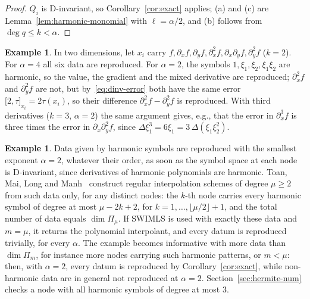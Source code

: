 \documentclass[12pt]{amsart}
\theoremstyle{definition}
\newtheorem{example}[theorem]{Example}
\theoremstyle{remark}
\newcommand{\fpz}[3]{\bigl[#1,#2\bigr]_{#3}}     %
\begin{document}
\begin{proof}
$Q_i$ is D-invariant, so Corollary~\ref{cor:exact} applies; (a) and (c) are
Lemma~\ref{lem:harmonic-monomial} with $\ell=\alpha/2$, and (b) follows from
$\deg q\le k<\alpha$.
\end{proof}

\begin{example}\label{ex:hermite2d}
In two dimensions, let $x_i$ carry $f,\partial_xf,\partial_yf,\partial_x^2f,\partial_x\partial_yf,
\partial_y^2f$ ($k=2$). For $\alpha=4$ all six data are reproduced. For $\alpha=2$, the symbols
$1,\xi_1,\xi_2,\xi_1\xi_2$ are harmonic, so the value, the gradient and the mixed derivative
are reproduced; $\partial_x^2f$ and $\partial_y^2f$ are not, but by~\eqref{eq:dinv-error} both
have the same error $\fpz{2}{\tau}{x_i}=2\tau(x_i)$, so their difference
$\partial_x^2f-\partial_y^2f$ is reproduced. With third derivatives ($k=3$, $\alpha=2$) the
same argument gives, e.g., that the error in $\partial_x^3f$ is three times the error in
$\partial_x\partial_y^2f$, since $\Delta\xi_1^3=6\xi_1=3\,\Delta(\xi_1\xi_2^2)$.
\end{example}

\begin{example}\label{ex:harmonic}
Data given by harmonic symbols are reproduced with the smallest exponent $\alpha=2$, whatever
their order, as soon as the symbol space at each node is D-invariant, since derivatives of
harmonic polynomials are harmonic. Toan, Mai, Long and Manh~\cite[Theorem~4.1]{ToanMaiLongPhung2026}
construct regular interpolation schemes of degree $\mu\ge2$ from such data only, for any distinct
nodes: the $k$-th node carries
every harmonic symbol of degree at most $\mu-2k+2$, for $k=1,\dots,\lfloor \mu/2\rfloor+1$, and the
total number of data equals $\dim\Pi_\mu$. If SWIMLS is used with exactly these data and $m=\mu$,
it returns the polynomial interpolant, and every datum is reproduced trivially, for every
$\alpha$. The example becomes informative with more data than $\dim\Pi_m$, for instance more
nodes carrying such harmonic patterns, or $m<\mu$: then, with $\alpha=2$, every datum is reproduced
by Corollary~\ref{cor:exact}, while non-harmonic data are in general not reproduced at
$\alpha=2$.
Section~\ref{sec:hermite-num} checks a node with all harmonic symbols of degree at most $3$.
\end{example}
\end{document}
